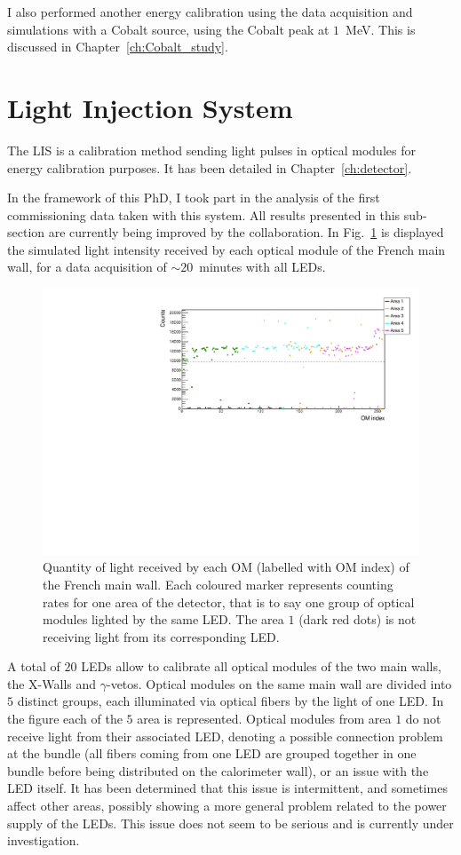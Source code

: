 I also performed another energy calibration using the data acquisition and simulations with a Cobalt source, using the Cobalt peak at $1$~MeV.
This is discussed in Chapter~\ref{ch:Cobalt_study}.


\section{Light Injection System}
\label{sec:LI}

The LIS is a calibration method sending light pulses in optical modules for energy calibration purposes.
It has been detailed in Chapter~\ref{ch:detector}.

In the framework of this PhD, I took part in the analysis of the first commissioning data taken with this system.
All results presented in this sub-section are currently being improved by the collaboration.
In Fig.~\ref{fig:LI_counts} is displayed the simulated light intensity received by each optical module of the French main wall, for a data acquisition of $\sim20$~minutes with all LEDs.
\begin{figure}[h!]
  \centering
  \includegraphics[width=15cm]{commissioning/fig_commissioning/LI_1d_counts.pdf}
  \caption{Quantity of light received by each OM (labelled with OM index) of the French main wall.
    Each coloured marker represents counting rates for one area of the detector, that is to say one group of optical modules lighted by the same LED.
    The area $1$ (dark red dots) is not receiving light from its corresponding LED.
    \label{fig:LI_counts}}
\end{figure}
A total of $20$ LEDs allow to calibrate all optical modules of the two main walls, the X-Walls and $\gamma$-vetos.
Optical modules on the same main wall are divided into $5$ distinct groups, each illuminated via optical fibers by the light of one LED.
In the figure each of the $5$ area is represented.
Optical modules from area $1$ do not receive light from their associated LED, denoting a possible connection problem at the bundle (all fibers coming from one LED are grouped together in one bundle before being distributed on the calorimeter wall), or an issue with the LED itself.
It has been determined that this issue is intermittent, and sometimes affect other areas, possibly showing a more general problem related to the power supply of the LEDs.
This issue does not seem to be serious and is currently under investigation.


